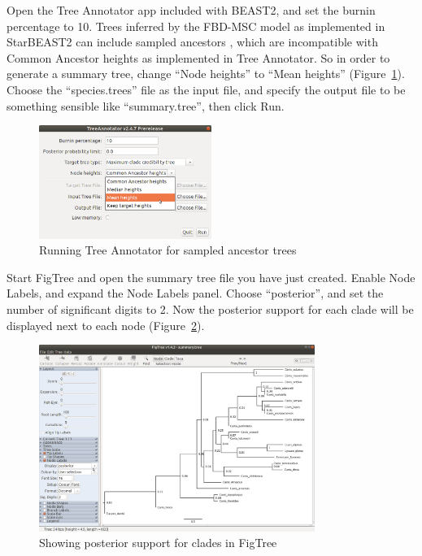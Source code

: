 \documentclass[12pt]{article}
\begin{document}
\clearpage

Open the Tree Annotator app included with BEAST2, and set the burnin
percentage to 10. Trees inferred by the FBD-MSC model as implemented in
StarBEAST2 can include sampled ancestors \citep{Gavryushkina2014}, which are
incompatible with Common Ancestor heights \citep{Heled2013} as implemented in
Tree Annotator. So in order to generate a summary tree, change ``Node heights'' to
``Mean heights'' (Figure~\ref{fig:treeAnnotatorMeanHeights}). Choose the
``species.trees'' file as the input file, and specify the output file to be
something sensible like ``summary.tree'', then click Run.

\begin{figure}[htb!]
\centering
\includegraphics[width=0.5\textwidth]{figures/treeAnnotatorMeanHeights.png}
\caption
{Running Tree Annotator for sampled ancestor trees}
\label{fig:treeAnnotatorMeanHeights}
\end{figure}

Start FigTree and open the summary tree file you have just created. Enable
Node Labels, and expand the Node Labels panel. Choose ``posterior'', and set
the number of significant digits to 2. Now the posterior support for each
clade will be displayed next to each node (Figure~\ref{fig:figtreeFBD}).

\clearpage

\begin{figure}[htb!]
\centering
\includegraphics[width=0.8\textwidth]{figures/figtreeFBD.png}
\caption
{Showing posterior support for clades in FigTree}
\label{fig:figtreeFBD}
\end{figure}
\end{document}
